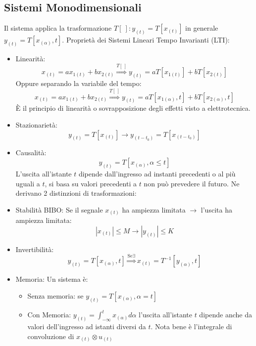     \subsection{Sistemi Monodimensionali}
        Il sistema applica la trasformazione $T[\ ]: y_{(t)} = T[x_{(t)}]$ in generale \\ $y_{(t)} = T[x_{(\alpha)},t]$. 
        Proprietà dei Sistemi Lineari Tempo Invarianti (LTI):
        \begin{itemize}
            \item {Linearità:
                \[
                    x_{(t)} = ax_{1(t)}+bx_{2(t)} \overset{T[\ ]}{\Rightarrow} y_{(t)} = aT[x_{1(t)}]+b T[x_{2(t)}]
                \]
                Oppure separando la variabile del tempo:
                \[
                    x_{(t)} = ax_{1(t)}+bx_{2(t)} \overset{T[\ ]}{\Rightarrow} y_{(t)} = aT[x_{1(\alpha)},t]+b T[x_{2(\alpha)},t]
                \]
                È il principio di linearità o sovrapposizione degli effetti visto a elettrotecnica.
            }
            \item {Stazionarietà:
                \[
                    y_{(t)} = T[x_{(t)}] \rightarrow y_{(t-t_0)} = T[x_{(t-t_0)}]  
                \]
            }
            \item {Causalità:
                \[
                    y_{(t)} = T[x_{(\alpha)},\alpha\leq t]
                \]
                L'uscita all'istante $t$ dipende dall'ingresso ad instanti precedenti o al più uguali a $t$, si basa su valori precedenti a 
                $t$ non può prevedere il futuro. Ne derivano 2 distinzioni di trasformazioni:
            }
            \item {Stabilità BIBO:
                Se il segnale $x_{(t)}$ ha ampiezza limitata $\rightarrow$ l'uscita ha ampiezza limitata:
                    \[
                        |x_{(t)}|\leq M \rightarrow |y_{(t)}|\leq K 
                    \]
            }
            \item {Invertibilità:
                \[
                    y_{(t)} = T[x_{(\alpha)},t] \overset{\text{Se} \exists}{\Rightarrow} x_{(t)} = T^{-1}[y_{(\alpha)},t]
                \]
            }
            \item {Memoria:
                Un sistema è:
                \begin{itemize}
                    \item {Senza memoria: se $y_{(t)} = T[x_{(\alpha)},\alpha=t]$}
                    \item {Con Memoria: $y_{(t)} =\int_{-\infty}^{t}x_{(\alpha)} d\alpha$ l'uscita all'istante $t$ dipende anche da valori dell'ingresso 
                          ad istanti diversi da $t$. Nota bene è l'integrale di convoluzione di $x_{(t)} \otimes u_{(t)}$ 
                    }
                \end{itemize}
            }
        \end{itemize}
